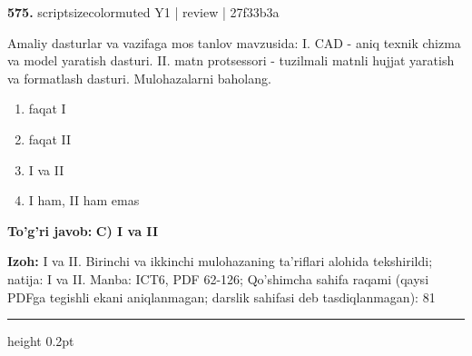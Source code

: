 \documentclass[10pt,a4paper]{article}
\begin{document}
{\bfseries\sffamily\color{ink} 575.} {scriptsizecolor{muted} Y1 | review | 27f33b3a}
\par
Amaliy dasturlar va vazifaga mos tanlov mavzusida: I. CAD - aniq texnik chizma va model yaratish dasturi. II. matn protsessori - tuzilmali matnli hujjat yaratish va formatlash dasturi. Mulohazalarni baholang.
\begin{enumerate}[label=\Alph*),leftmargin=9mm]
\item faqat I
\item faqat II
\item I va II
\item I ham, II ham emas
\end{enumerate}
\begin{tcolorbox}[enhanced,breakable,colback=teal!4,colframe=teal!60!black,boxrule=0.45pt,arc=1.2mm,left=2.7mm,right=2.7mm,top=1.8mm,bottom=1.8mm,before skip=2mm,after skip=2mm]
{\bfseries\sffamily\color{teal}To'g'ri javob:} \textbf{C) I va II}
\par\smallskip
{\bfseries Izoh:} I va II. Birinchi va ikkinchi mulohazaning ta'riflari alohida tekshirildi; natija: I va II. Manba: ICT6, PDF 62-126; Qo'shimcha sahifa raqami (qaysi PDFga tegishli ekani aniqlanmagan; darslik sahifasi deb tasdiqlanmagan): 81
\end{tcolorbox}
\vspace{2mm}\hrule height 0.2pt\vspace{3mm}
\end{document}
